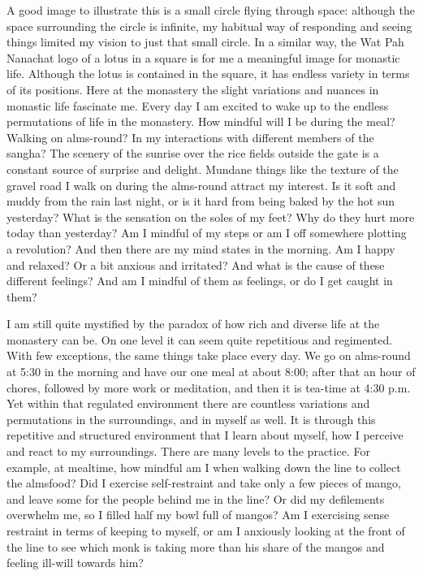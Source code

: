 A good image to illustrate this is a small circle flying through space:
although the space surrounding the circle is infinite, my habitual way
of responding and seeing things limited my vision to just that small
circle. In a similar way, the Wat Pah Nanachat logo of a lotus in a
square is for me a meaningful image for monastic life. Although the
lotus is contained in the square, it has endless variety in terms of its
positions. Here at the monastery the slight variations and nuances in
monastic life fascinate me. Every day I am excited to wake up to the
endless permutations of life in the monastery. How mindful will I be
during the meal? Walking on alms-round? In my interactions with
different members of the sangha? The scenery of the sunrise over the
rice fields outside the gate is a constant source of surprise and
delight. Mundane things like the texture of the gravel road I walk on
during the alms-round attract my interest. Is it soft and muddy from the
rain last night, or is it hard from being baked by the hot sun
yesterday? What is the sensation on the soles of my feet? Why do they
hurt more today than yesterday? Am I mindful of my steps or am I off
somewhere plotting a revolution? And then there are my mind states in
the morning. Am I happy and relaxed? Or a bit anxious and irritated? And
what is the cause of these different feelings? And am I mindful of them
as feelings, or do I get caught in them?

I am still quite mystified by the paradox of how rich and diverse life
at the monastery can be. On one level it can seem quite repetitious and
regimented. With few exceptions, the same things take place every day.
We go on alms-round at 5:30 in the morning and have our one meal at
about 8:00; after that an hour of chores, followed by more work or
meditation, and then it is tea-time at 4:30 p.m. Yet within that
regulated environment there are countless variations and permutations in
the surroundings, and in myself as well. It is through this repetitive
and structured environment that I learn about myself, how I perceive and
react to my surroundings. There are many levels to the practice. For
example, at mealtime, how mindful am I when walking down the line to
collect the almsfood? Did I exercise self-restraint and take only a few
pieces of mango, and leave some for the people behind me in the line? Or
did my defilements overwhelm me, so I filled half my bowl full of
mangos? Am I exercising sense restraint in terms of keeping to myself,
or am I anxiously looking at the front of the line to see which monk is
taking more than his share of the mangos and feeling ill-will towards
him?

